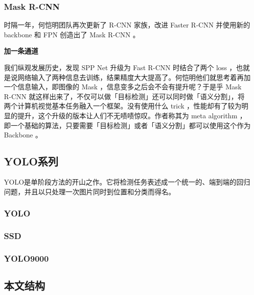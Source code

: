 \subsubsection{Mask R-CNN}
时隔一年，何恺明团队再次更新了 R-CNN 家族，改进 Faster R-CNN 并使用新的 backbone 和 FPN 创造出了 Mask R-CNN 。

\textbf{加一条通道}

我们纵观发展历史，发现 SPP Net 升级为 Fast R-CNN 时结合了两个 loss ，也就是说网络输入了两种信息去训练，结果精度大大提高了。何恺明他们就思考着再加一个信息输入，即图像的 Mask ，信息变多之后会不会有提升呢？于是乎 Mask R-CNN 就这样出来了，不仅可以做「目标检测」还可以同时做「语义分割」，将两个计算机视觉基本任务融入一个框架。没有使用什么 trick ，性能却有了较为明显的提升，这个升级的版本让人们不无啧啧惊叹。作者称其为 meta algorithm ，即一个基础的算法，只要需要「目标检测」或者「语义分割」都可以使用这个作为 Backbone 。
\subsection{YOLO系列}
YOLO是单阶段方法的开山之作。它将检测任务表述成一个统一的、端到端的回归问题，并且以只处理一次图片同时到位置和分类而得名。

\subsubsection{YOLO}
\subsubsection{SSD}
\subsubsection{YOLO9000}
\subsection{本文结构}

